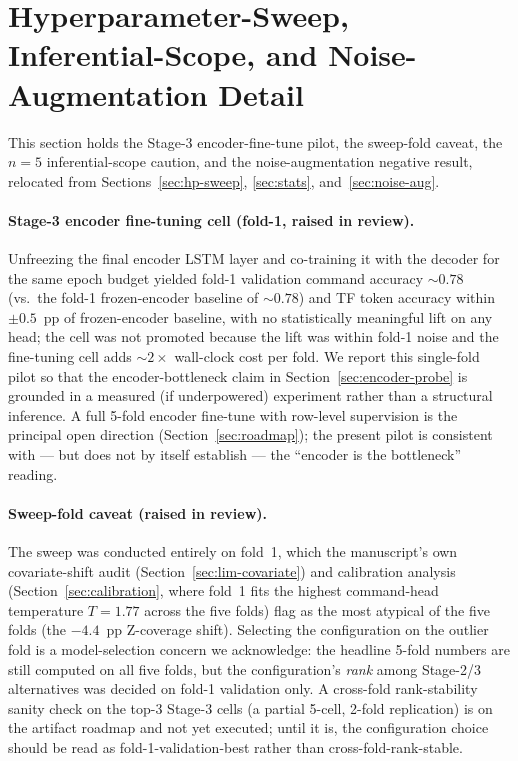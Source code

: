 \documentclass[11pt,a4paper]{article}
\begin{document}
\section{Hyperparameter-Sweep, Inferential-Scope, and Noise-Augmentation Detail}
\label{app:sweep-stats-noiseaug}

This section holds the Stage-3 encoder-fine-tune pilot, the sweep-fold caveat,
the $n=5$ inferential-scope caution, and the noise-augmentation negative result,
relocated from Sections~\ref{sec:hp-sweep}, \ref{sec:stats}, and~\ref{sec:noise-aug}.

\paragraph{Stage-3 encoder fine-tuning cell (fold-1, raised in review).} Unfreezing the final encoder LSTM layer and co-training it with the decoder for the same epoch budget yielded fold-1 validation command accuracy $\sim\!0.78$ (vs.\ the fold-1 frozen-encoder baseline of $\sim\!0.78$) and TF token accuracy within $\pm 0.5$~pp of frozen-encoder baseline, with no statistically meaningful lift on any head; the cell was not promoted because the lift was within fold-1 noise and the fine-tuning cell adds $\sim 2\times$ wall-clock cost per fold. We report this single-fold pilot so that the encoder-bottleneck claim in Section~\ref{sec:encoder-probe} is grounded in a measured (if underpowered) experiment rather than a structural inference. A full 5-fold encoder fine-tune with row-level supervision is the principal open direction (Section~\ref{sec:roadmap}); the present pilot is consistent with --- but does not by itself establish --- the ``encoder is the bottleneck'' reading.

\paragraph{Sweep-fold caveat (raised in review).} The sweep was conducted entirely on fold~1, which the manuscript's own covariate-shift audit (Section~\ref{sec:lim-covariate}) and calibration analysis (Section~\ref{sec:calibration}, where fold~1 fits the highest command-head temperature $T\!=\!1.77$ across the five folds) flag as the most atypical of the five folds (the $-4.4$~pp Z-coverage shift). Selecting the configuration on the outlier fold is a model-selection concern we acknowledge: the headline 5-fold numbers are still computed on all five folds, but the configuration's \emph{rank} among Stage-2/3 alternatives was decided on fold-1 validation only. A cross-fold rank-stability sanity check on the top-3 Stage-3 cells (a partial 5-cell, 2-fold replication) is on the artifact roadmap and not yet executed; until it is, the configuration choice should be read as fold-1-validation-best rather than cross-fold-rank-stable.
\end{document}
